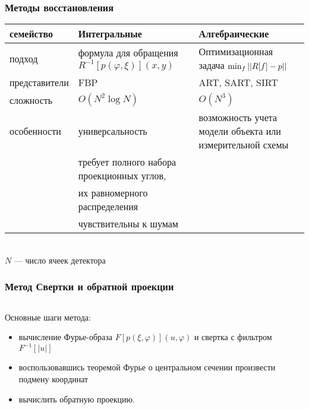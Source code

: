\begingroup
\small
\begin{frame}
\frametitle{Методы восстановления}
\begin{tabular}{p{} | p{} | p{}}
\hspace{-1cm} семейство & Интегральные & Алгебраические \\ \hline \vspace{10pt}
\hspace{-1cm} подход & формула для обращения $R^{-1}[p(\varphi, \xi)](x,y)$ & Оптимизационная задача $\min_{f} \left|\left| R[f] - p \right|\right|$\\ \hline \vspace{10pt}
\hspace{-1cm} представители & FBP & ART, SART, SIRT \\ \hline \vspace{10pt}
\hspace{-1cm} сложность & $O(N^2 \log N)$ & $O(N^3)$ \\ \hline \vspace{10pt}
\hspace{-1cm} особенности & универсальность & возможность учета \hspace{1cm} модели объекта или измерительной схемы \\
                          & требует полного набора проекционных углов, & \\ 
                          & их равномерного распределения & \\
                          & чувствительны к шумам & \\
\end{tabular}
\\
\vspace{5pt}
$N$ --- число ячеек детектора
\end{frame}
\endgroup

\begin{frame}
\frametitle{Метод Свертки и обратной проекции}
\begin{columns}
  
  \begin{column}{0.5\textwidth}
    Основные шаги метода:
    \begin{itemize}
    \item вычисление Фурье-образа $F[p(\xi, \varphi)](u, \varphi)$ и свертка с фильтром $F^{-1}[|u|]$
    \item воспользовавшись теоремой Фурье о центральном сечении произвести подмену координат
    \item вычислить обратную проекцию.
    \end{itemize}
  \end{column}

  \begin{column}{0.5\textwidth}
  \end{column}

\end{columns}
\end{frame}


